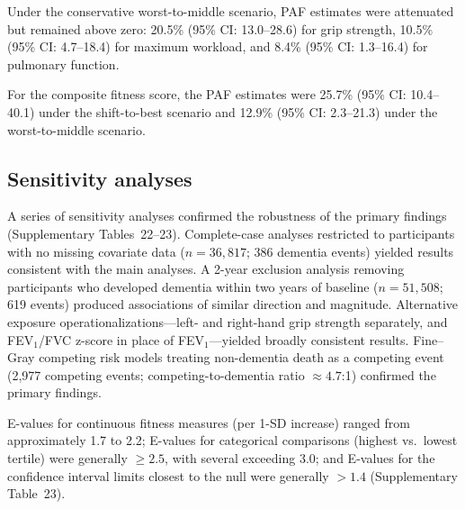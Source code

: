 \documentclass{article}
\begin{document}
Under the conservative worst-to-middle scenario, PAF estimates were 
attenuated but remained above zero: 20.5\% (95\% CI: 13.0--28.6) for 
grip strength, 10.5\% (95\% CI: 4.7--18.4) for maximum workload, and 
8.4\% (95\% CI: 1.3--16.4) for pulmonary function.

For the composite fitness score, the PAF estimates were 25.7\% (95\% CI: 10.4--40.1) under the shift-to-best scenario and 12.9\% (95\% CI: 2.3--21.3) under the worst-to-middle scenario.



\subsection*{Sensitivity analyses}

A series of sensitivity analyses confirmed the robustness of the primary 
findings (Supplementary Tables~22--23).
Complete-case analyses restricted to participants with no missing covariate 
data ($n = 36{,}817$; 386 dementia events) yielded results consistent with 
the main analyses.
A 2-year exclusion analysis removing participants who developed dementia 
within two years of baseline ($n = 51{,}508$; 619 events) produced 
associations of similar direction and magnitude.
Alternative exposure operationalizations—left- and right-hand grip 
strength separately, and FEV$_1$/FVC z-score in place of FEV$_1$—yielded 
broadly consistent results.
Fine--Gray competing risk models treating non-dementia death as a 
competing event (2,977 competing events; competing-to-dementia ratio 
$\approx 4.7$:1) confirmed the primary findings.

E-values for continuous fitness measures (per 1-SD increase) ranged 
from approximately 1.7 to 2.2; E-values for categorical comparisons 
(highest vs.\ lowest tertile) were generally $\geq 2.5$, with several 
exceeding 3.0; and E-values for the confidence interval limits closest 
to the null were generally $> 1.4$ (Supplementary Table~23).
\end{document}
